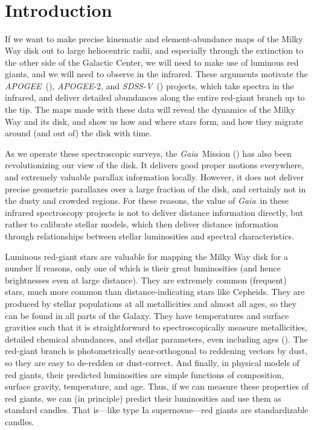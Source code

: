 \documentclass[modern]{aastex62}
\newcommand{\acronym}[1]{{\small{#1}}}
\newcommand{\project}[1]{\textsl{#1}}
\newcommand{\apogee}{\project{\acronym{APOGEE}}}
\newcommand{\gaia}{\project{Gaia}}
\newcommand{\sdssv}{\project{\acronym{SDSS-V}}}
\begin{document}

\section*{~}\clearpage
\section{Introduction} \label{sec:intro}

If we want to make precise kinematic and element-abundance maps
of the Milky Way disk out to large heliocentric radii,
and especially through the extinction to the other side of the Galactic Center, we will
need to make use of luminous red giants, and we will need to observe in
the infrared.
These arguments motivate the \apogee\ (\citealt{apogee}),
\apogee-2, and \sdssv\ (\citealt{sdssv})
projects, which take spectra in the infrared, and deliver detailed abundances
along the entire red-giant branch up to the tip.
The maps made with these data will reveal the dynamics of the Milky Way and its disk,
and show us how and where stars form, and how they migrate around (and out of) the
disk with time.

As we operate these spectroscopic surveys,
the \gaia\ Mission (\citealt{gaia}) has also been revolutionizing our view of the disk.
It delivers good proper motions everywhere,
and extremely valuable parallax information locally.
However, it does not deliver precise geometric parallaxes over a large fraction of
the disk, and certainly not in the dusty and crowded regions.
For these reasons, the value of \gaia\ in these infrared spectroscopy projects is not
to deliver distance information directly, but rather to calibrate stellar models,
which then deliver distance information through relationships between stellar
luminosities and spectral characteristics.

Luminous red-giant stars are valuable for mapping the Milky Way disk for a number
lf reasons, only one of which is their great luminosities (and hence brightnesses
even at large distance).
They are extremely common (frequent) stars, much more common than distance-indicating
stars like Cepheids.
They are produced by stellar populations at all metallicities and almost all ages,
so they can be found in all parts of the Galaxy.
They have temperatures and surface gravities such that it is
straightforward to spectroscopically measure metallicities,
detailed chemical abundances, and stellar parameters, even including ages (\citealt{martig, nessage}).
The red-giant branch is photometrically near-orthogonal to reddening vectors by dust,
so they are easy to de-redden or dust-correct.
And finally, in physical models of red giants, their predicted luminosities are simple
functions of composition, surface gravity, temperature, and age.
Thus, if we can measure these properties of red giants, we can (in principle) predict
their luminosities and use them as standard candles.
That is---like type Ia supernovae---red giants are standardizable candles.
\end{document}
